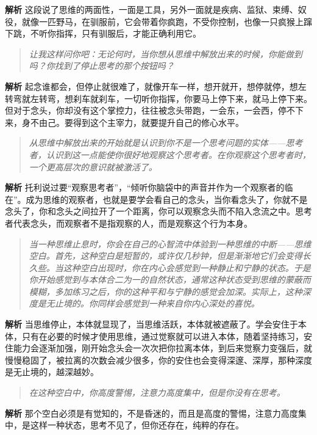 \textbf{解析} 这段说了思维的两面性，一面是工具，另外一面就是疾病、监狱、束缚、奴役，就像一匹野马，在驯服前，它会带着你疯跑，不受你控制，也像一只疯猴上蹿下跳，不听你指挥，只有驯服后，才能正确利用它。

\begin{quote}\it
    让我这样问你吧：无论何时，当你想从思维中解放出来的时候，你能做到吗？你找到了停止思考的那个按钮吗？
\end{quote}

\textbf{解析} 起念谁都会，但停止就很难了，就像开车一样，想开就开，想停就停，想左转弯就左转弯，想刹车就刹车，一切听你指挥，你要马上停下来，就马上停下来。但对于念头，你却没有这个掌控力，往往被念头带跑，一会东，一会西，停不下来，身不由己。要得到这个主宰力，就要提升自己的修心水平。

\begin{quote}\it
    从思维中解放出来的开始就是认识到你不是一个思考问题的实体——思考者，认识到这一点能使你很好地观察这个思考者。在你观察这个思考者时，一个更高层次的意识就被激活了。
\end{quote}

\textbf{解析} 托利说过要“观察思考者”，“倾听你脑袋中的声音并作为一个观察者的临在”。成为思维的观察者，也就是要学会看自己的念头，当你看念头了，你就不是念头了，你和念头之间拉开了一个距离，你可以观察念头而不陷入念流之中。思考者代表念头，而观察者不是指观察的人，而是观察这个行为本身。

\begin{quote}\it
    当一种思维止息时，你会在自己的心智流中体验到一种思维的中断——思维空白。首先，这种空白是短暂的，或许仅几秒钟，但是渐渐地它们会变得长久些。当这种空白出现时，你在内心会感觉到一种静止和宁静的状态。于是你开始感觉到与本体合二为一的自然状态，通常这种状态受到思维的蒙蔽而模糊，多加练习之后，你的这种平和与宁静的感觉会加深。实际上，这种深度是无止境的。你同样会感觉到一种来自你内心深处的喜悦。
\end{quote}

\textbf{解析} 当思维停止，本体就显现了，当思维活跃，本体就被遮蔽了。学会安住于本体，只有在必要的时候才使用思维，通过觉察就可以进入本体，随着坚持练习，安住能力会逐渐加强，刚开始念头会一次次把你拉离本体，到后来觉察力变强后，就慢慢稳固了，被拉离的次数会减少很多，你的安住也会变得深邃、深厚，那种深度是无止境的，越深越妙。

\begin{quote}\it
    在这种空白中，你高度警惕，注意力高度集中，但是你没有在思考。
\end{quote}

\textbf{解析} 那个空白必须是有觉知的，不是昏迷的，而且是高度的警惕，注意力高度集中，是这样一种状态，思考不见了，但你还存在，纯粹的存在。

